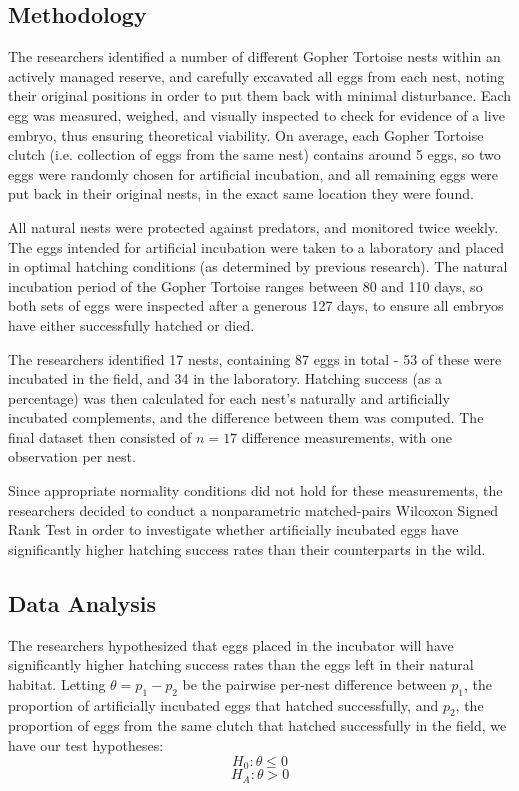 \documentclass{article}
\begin{document}
\begin{multicols}{2}
\subsection*{Methodology}

The researchers identified a number of different Gopher Tortoise nests within an actively managed reserve, and carefully excavated all eggs from each nest, noting their original positions in order to put them back with minimal disturbance. Each egg was measured, weighed, and visually inspected to check for evidence of a live embryo, thus ensuring theoretical viability. On average, each Gopher Tortoise clutch (i.e. collection of eggs from the same nest) contains around 5 eggs, so two eggs were randomly chosen for artificial incubation, and all remaining eggs were put back in their original nests, in the exact same location they were found. 

All natural nests were protected against predators, and monitored twice weekly. The eggs intended for artificial incubation were taken to a laboratory and placed in optimal hatching conditions (as determined by previous research). The natural incubation period of the Gopher Tortoise ranges between 80 and 110 days, so both sets of eggs were inspected after a generous 127 days, to ensure all embryos have either successfully hatched or died. 

The researchers identified 17 nests, containing 87 eggs in total - 53 of these were incubated in the field, and 34 in the laboratory. Hatching success (as a percentage) was then calculated for each nest's naturally and artificially incubated complements, and the difference between them was computed. The final dataset then consisted of $n = 17$ difference measurements, with one observation per nest.

Since appropriate normality conditions did not hold for these measurements, the researchers decided to conduct a nonparametric matched-pairs Wilcoxon Signed Rank Test in order to investigate whether artificially incubated eggs have significantly higher hatching success rates than their counterparts in the wild. 


\newpage
\subsection*{Data Analysis}

The researchers hypothesized that eggs placed in the incubator will have significantly higher hatching success rates than the eggs left in their natural habitat. Letting $\theta = p_1 - p_2$ be the pairwise per-nest difference between $p_1$, the proportion of artificially incubated eggs that hatched successfully, and $p_2$, the proportion of eggs from the same clutch that hatched successfully in the field, we have our test hypotheses:
$$H_0: \theta \leq 0$$
$$H_A: \theta > 0$$


\end{multicols}
\end{document}
